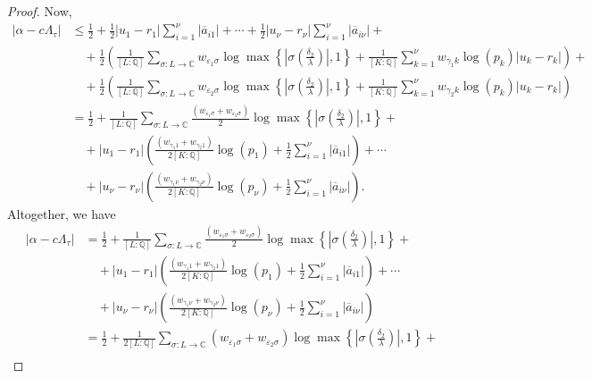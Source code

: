 \begin{proof}
Now, 
\begin{align*}
|\alpha-c\Lambda_\tau| 
	& \leq \frac{1}{2} + \frac{1}{2}|u_1-r_1|\sum_{i=1}^{\nu}|\overline{a}_{i1}| + \cdots + \frac{1}{2}|u_{\nu} - r_{\nu}| \sum_{i=1}^{\nu}|\overline{a}_{i\nu}| + \\
	& \quad + \frac{1}{2}\left(\frac{1}{[L:\mathbb{Q}]}\sum_{\sigma :L \to \mathbb{C}} w_{\varepsilon_1 \sigma}\log \max \left\{ \left|\sigma\left(\frac{\delta_2}{\lambda}\right)\right|, 1\right\} + \frac{1}{[K:\mathbb{Q}]}\sum_{k = 1}^{\nu} w_{\gamma_1 k}\log(p_k)|u_k - r_k| \right) + \\
	&\quad + \frac{1}{2}\left(\frac{1}{[L:\mathbb{Q}]}\sum_{\sigma :L \to \mathbb{C}} w_{\varepsilon_2 \sigma}\log \max \left\{ \left|\sigma\left(\frac{\delta_2}{\lambda}\right)\right|, 1\right\} + \frac{1}{[K:\mathbb{Q}]}\sum_{k = 1}^{\nu} w_{\gamma_2 k}\log(p_k)|u_k - r_k| \right) \\
	& = \frac{1}{2} + \frac{1}{[L:\mathbb{Q}]}\sum_{\sigma :L \to \mathbb{C}} \frac{(w_{\varepsilon_1 \sigma} + w_{\varepsilon_2 \sigma})}{2}\log \max \left\{ \left|\sigma\left(\frac{\delta_2}{\lambda}\right)\right|, 1\right\} + \\
	& \quad + |u_1 - r_1|\left( \frac{(w_{\gamma_1 1} + w_{\gamma_2 1})}{2[K:\mathbb{Q}]}\log(p_1) + \frac{1}{2}\sum_{i=1}^{\nu}|\overline{a}_{i1}|\right) + \cdots \\
	& \quad + |u_{\nu} - r_{\nu}|\left( \frac{(w_{\gamma_1 {\nu}} + w_{\gamma_2 {\nu}})}{2[K:\mathbb{Q}]}\log(p_{\nu}) + \frac{1}{2}\sum_{i=1}^{\nu}|\overline{a}_{i{\nu}}|\right). 
\end{align*}
Altogether, we have
\begin{align*}
|\alpha-c\Lambda_\tau| 
	& = \frac{1}{2} + \frac{1}{[L:\mathbb{Q}]}\sum_{\sigma :L \to \mathbb{C}} \frac{(w_{\varepsilon_1 \sigma} + w_{\varepsilon_2 \sigma})}{2}\log \max \left\{ \left|\sigma\left(\frac{\delta_2}{\lambda}\right)\right|, 1\right\} + \\
	& \quad + |u_1 - r_1|\left( \frac{(w_{\gamma_1 1} + w_{\gamma_2 1})}{2[K:\mathbb{Q}]}\log(p_1) + \frac{1}{2}\sum_{i=1}^{\nu}|\overline{a}_{i1}|\right) + \cdots \\
	& \quad + |u_{\nu} - r_{\nu}|\left( \frac{(w_{\gamma_1 {\nu}} + w_{\gamma_2 {\nu}})}{2[K:\mathbb{Q}]}\log(p_{\nu}) + \frac{1}{2}\sum_{i=1}^{\nu}|\overline{a}_{i{\nu}}|\right)\\
	& = \frac{1}{2} + \frac{1}{2[L:\mathbb{Q}]}\sum_{\sigma :L \to \mathbb{C}} (w_{\varepsilon_1 \sigma} + w_{\varepsilon_2 \sigma})\log \max \left\{ \left|\sigma\left(\frac{\delta_2}{\lambda}\right)\right|, 1\right\} + \\

\end{align*}
\end{proof}

